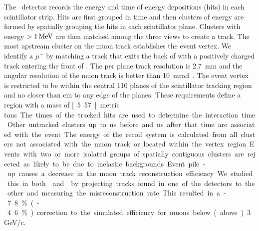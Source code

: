 
The \minerva\ detector records the energy and time of energy depositions (hits) in each scintillator strip.  Hits are first grouped in time and then clusters of energy are formed by spatially grouping the hits in each scintillator plane.  Clusters with energy $>\unit[1]{MeV}$ are then matched among the three views to create a track. The most upstream cluster on the muon track establishes the event vertex. We identify a $\mu^+$ by matching a track that exits the back of \minerva with a positively charged track entering the front of \minos. The per plane track resolution is 2.7~mm and the angular resolution of the
muon track is better than 10~mrad~\cite{minerva_nim}.  
 The event vertex is restricted to be within the central 110 planes of the scintillator tracking region and no closer than \unit[22]{cm} to any edge of the planes. These requirements define a region with a mass of \unit[5.57]{metric tons}.


The times of the tracked hits are used to determine the interaction time.  
Other untracked clusters up to \unit[20]{ns} before and 
\unit[35]{ns} after that time are associated with the event.  The energy of the 
recoil system  is calculated from all clusters not associated with the muon
track or located within the vertex region.
Events with two or more isolated groups of
spatially contiguous clusters 
are rejected as likely to be due to 
inelastic backgrounds.

Event pile-up causes a decrease in the muon track reconstruction efficiency. We studied this in both \minerva and \minos by projecting tracks found in one of the detectors to the other and measuring the misreconstruction rate. This resulted in a -7.8\% (-4.6\%) correction to the simulated efficiency for muons below (above) 3 GeV/c.

